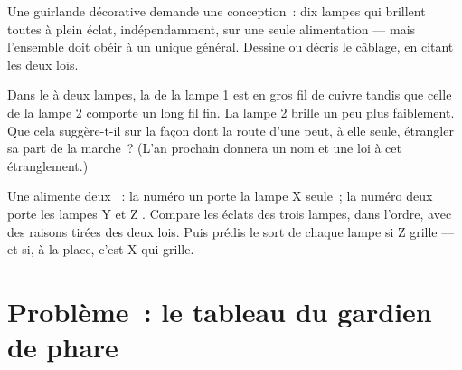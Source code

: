 \begin{exercise}[$\star\star$]\label{exo:g7:circuits-series-parallel:10}
Une guirlande décorative demande une conception~: dix lampes qui
brillent toutes à plein éclat, indépendamment, sur une seule
alimentation --- mais l'ensemble doit obéir à un unique 
général. Dessine ou décris le câblage, en citant les deux lois.
\end{exercise}

\begin{exercise}[$\star\star$]\label{exo:g7:circuits-series-parallel:11}
Dans le  à deux lampes, la  de la lampe 1
est en gros fil de cuivre tandis que celle de la lampe 2 comporte un
long fil fin. La lampe 2 brille un peu plus faiblement. Que cela
suggère-t-il sur la façon dont la route d'une  peut, à elle
seule, étrangler sa part de la marche~? (L'an prochain donnera un nom
et une loi à cet étranglement.)
\end{exercise}

\begin{exercise}[$\star\star\star$]\label{exo:g7:circuits-series-parallel:12}
Une  alimente deux  ~: la  numéro un
porte la lampe X seule~; la  numéro deux porte les lampes Y et
Z . Compare les éclats des trois lampes, dans l'ordre, avec
des raisons tirées des deux lois. Puis prédis le sort de chaque lampe
si Z grille --- et si, à la place, c'est X qui grille.
\end{exercise}

\section{Problème~: le tableau du gardien de phare}

